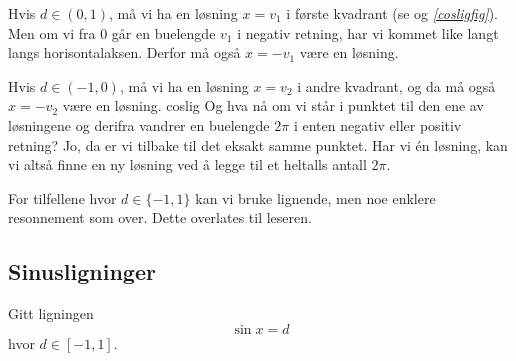 Hvis $ d\in(0,1)$, må vi ha en løsning $ {x=v_1} $ i første kvadrant (se  og \textsl{\ref{cosligfig}}). Men om vi fra 0 går en buelengde $ v_1 $ i negativ retning, har vi kommet like langt langs horisontalaksen. Derfor må også $ {x=-v_1} $ være en løsning.\vsk

Hvis $ d\in(-1, 0) $, må vi ha en løsning $ {x=v_2} $ i andre kvadrant, og da må også ${ x=-v_2} $ være en løsning.
{coslig}
Og hva nå om vi står i punktet til den ene av løsningene og derifra vandrer en buelengde $ 2\pi $ i enten negativ eller positiv retning? Jo, da er vi tilbake til det eksakt samme punktet. Har vi én løsning, kan vi altså finne en ny løsning ved å legge til et heltalls antall $ 2\pi $.\vsk

For tilfellene hvor $d\in\{-1, 1\}$ kan vi bruke lignende, men noe enklere resonnement som over. Dette overlates til leseren.
\newpage
\subsection{Sinusligninger}
Gitt ligningen 
\begin{equation*}
\sin x = d 
\end{equation*}
hvor $d\in[-1, 1]$. \vsk

